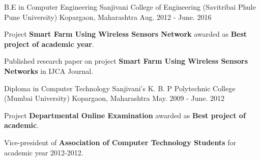

\begin{cventries}

  \cventry
    {B.E in Computer Engineering} %
    {Sanjivani College of Engineering (Savitribai Phule Pune University)} %
    {Kopargaon, Maharashtra} %
    {Aug. 2012 - June. 2016} %
    {
      \begin{cvitems} %
      	\item {Project \textbf{Smart Farm Using Wireless Sensors Network} awarded as \textbf{Best project of academic year}.}
        \item {Published research paper on project \textbf{Smart Farm Using Wireless Sensors Networks} in IJCA Journal.}         
      \end{cvitems}
    }
    \cventry
    {Diploma in Computer Technology} %
    {Sanjivani's K. B. P Polytechnic College (Mumbai University)} %
    {Kopargaon, Maharashtra} %
    {May. 2009 - June. 2012} %
    {
      \begin{cvitems} %
      	\item {Project \textbf{Departmental Online Examination} awarded as \textbf{Best project of academic}.}
        \item {Vice-president of \textbf{Association of Computer Technology Students} for academic year 2012-2012.}
      \end{cvitems}
    }

\end{cventries}
